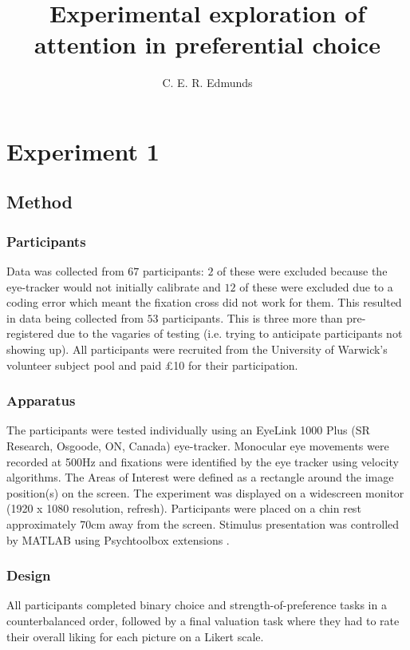 \documentclass[doc, a4paper, apacite]{apa6}
\title{Experimental exploration of attention in preferential choice}
\author{C. E. R. Edmunds}
\affiliation{University of Warwick}
\begin{document}
\maketitle


\section{Experiment 1} \label{exp:NS01} 
\subsection{Method}
\subsubsection{Participants}
Data was collected from $67$ participants: $2$ of these were excluded because the eye-tracker would not initially calibrate and $12$ of these were excluded due to a coding error which meant the fixation cross did not work for them. This resulted in data being collected from $53$ participants. This is three more than pre-registered due to the vagaries of testing (i.e. trying to anticipate participants not showing up). All participants were recruited from the University of Warwick’s volunteer subject pool and paid \pounds10 for their participation.

\subsubsection{Apparatus}
The participants were tested individually using an EyeLink 1000 Plus (SR Research, Osgoode, ON, Canada) eye-tracker. Monocular eye movements were recorded at 500Hz and fixations were identified by the eye tracker using velocity algorithms. The Areas of Interest were defined as a rectangle around the image position(s) on the screen. The experiment was displayed on a widescreen monitor (1920 x 1080 resolution, refresh). Participants were placed on a chin rest approximately 70cm away from the screen. Stimulus presentation was controlled by MATLAB using Psychtoolbox extensions \cite{Brainard1997, Pelli1997}.

\subsubsection{Design}
All participants completed binary choice and strength-of-preference tasks in a counterbalanced order, followed by a final valuation task where they had to rate their overall liking for each picture on a Likert scale. 
\end{document}
